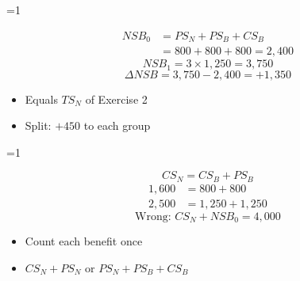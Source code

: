 \documentclass{beamer}
\newcommand{\showanswers}{0}
\begin{document}
\ifnum\showanswers=1
\begin{frame}[plain,label=w2_ans_q33b]
  \Large
  \begin{align*}
    \tag{M48}\;NSB_0 &= PS_N + PS_B + CS_B\\
                    &= 800 + 800 + 800 = 2{,}400
  \end{align*}
  \[
    \tag{M49}\;NSB_1 = 3 \times 1{,}250 = 3{,}750
  \]
  \[
    \tag{M50}\;\Delta NSB = 3{,}750 - 2{,}400 = +1{,}350
  \]

  \vspace{0.3em}
  \begin{itemize}\Large
    \item Equals $TS_N$ of Exercise 2
    \item Split: $+450$ to each group
  \end{itemize}
\end{frame}
\fi

\ifnum\showanswers=1
\begin{frame}[plain,label=w2_ans_q33c]
  \Large
  \[
    \tag{M51}\;CS_N = CS_B + PS_B
  \]
  \begin{align*}
    \tag{M52}\;1{,}600 &= 800 + 800\\
    \tag{M53}\;2{,}500 &= 1{,}250 + 1{,}250
  \end{align*}
  \[
    \tag{M54}\;\text{Wrong: } CS_N + NSB_0 = 4{,}000
  \]

  \vspace{0.3em}
  \begin{itemize}\Large
    \item Count each benefit once
    \item $CS_N + PS_N$ or $PS_N + PS_B + CS_B$
  \end{itemize}
\end{frame}
\fi
\end{document}
